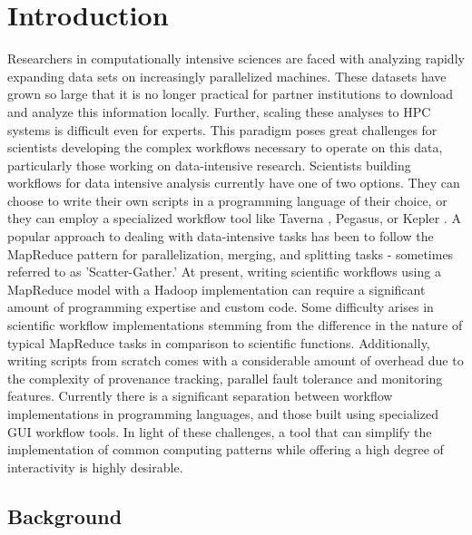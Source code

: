 \section{Introduction}
Researchers in computationally intensive sciences are faced with analyzing rapidly expanding data sets on increasingly parallelized machines. These datasets have grown so large that it is no longer practical for partner institutions to download and analyze this information locally. Further, scaling these analyses to HPC systems is difficult even for experts. This paradigm poses great challenges for scientists developing the complex workflows necessary to operate on this data, particularly those working on data-intensive research. Scientists building workflows for data intensive analysis currently have one of two options. They can choose to write their own scripts in a programming language of their choice, or they can employ a specialized workflow tool like Taverna \cite{taverna}, Pegasus\cite{pegasus}, or Kepler \cite{kepler}. A popular approach to dealing with data-intensive tasks has been to follow the MapReduce pattern for parallelization, merging, and splitting tasks - sometimes referred to as 'Scatter-Gather.' At present, writing scientific workflows using a MapReduce model with a Hadoop implementation can require a significant amount of programming expertise and custom code. Some difficulty arises in scientific workflow implementations stemming from the difference in the nature of typical MapReduce tasks in comparison to scientific functions. Additionally, writing scripts from scratch comes with a considerable amount of overhead due to the complexity of provenance tracking, parallel fault tolerance and monitoring features. Currently there is a significant separation between workflow implementations in programming languages, and those built using specialized GUI workflow tools. In light of these challenges, a tool that can simplify the implementation of common computing patterns while offering a high degree of interactivity is highly desirable.




\subsection{Background}

